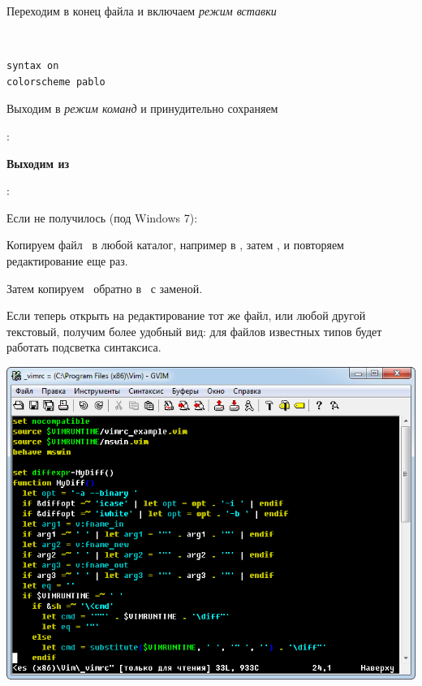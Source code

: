 \nopagebreak
{}
\bigskip

Переходим в конец файла и включаем \emph{режим вставки}

\ \ 

\begin{lstlisting}
syntax on
colorscheme pablo
\end{lstlisting}
\bigskip

Выходим в \emph{режим команд} и принудительно сохраняем

:\keys{!}
\bigskip

\textbf{Выходим из \vim}

:\keys{!}

\bigskip
Если не получилось (под Windows 7):

\bigskip
{}
\bigskip

Копируем файл \ в любой каталог, например в ,
затем , и повторяем редактирование еще раз.

\bigskip
Затем копируем \ обратно в \ с
заменой.

\bigskip
Если теперь открыть на редактирование тот же файл, или любой другой текстовый,
получим более удобный вид: для файлов известных типов будет работать подсветка
синтаксиса.

\nopagebreak\bigskip
\includegraphics[height=0.9\textheight]{ide/vim28.png}

